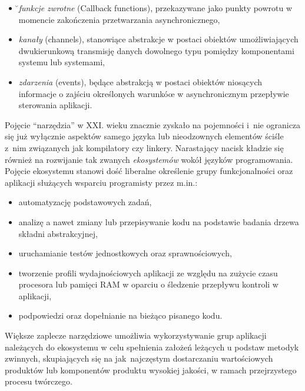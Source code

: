 {\begin{itemize}
  \begin{itemize}
    \item ̆\emph{funkcje zwrotne} (Callback functions), przekazywane jako punkty powrotu w momencie zakończenia przetwarzania asynchronicznego,
    \item \emph{kanały} (channels), stanowiące abstrakcje w postaci obiektów umożliwiających dwukierunkową transmisję danych dowolnego typu pomiędzy komponentami systemu lub systemami,
    \item \emph{zdarzenia} (events), będące abstrakcją w postaci obiektów niosących informacje o zajściu określonych warunkóœ w asynchronicznym przepływie sterowania aplikacji.
  \end{itemize}
\end{itemize}
}

\par{
  Pojęcie ``narzędzia'' w XXI. wieku znacznie zyskało na pojemności i~nie ogranicza się już wyłącznie aspektów samego języka lub nieodzownych elementów ściśle z~nim związanych jak kompilatory czy linkery.
  Narastający nacisk kładzie się również na rozwijanie tak zwanych \emph{ekosystemów} wokół języków programowania.
  Pojęcie ekosystemu stanowi dość liberalne określenie grupy funkcjonalności oraz aplikacji służących wsparciu programisty przez m.in.:
  \begin{itemize}
    \item automatyzację podstawowych zadań,
    \item analizę a nawet zmiany lub przepisywanie kodu na podstawie badania drzewa składni abstrakcyjnej,
    \item uruchamianie testów jednostkowych oraz sprawnościowych,
    \item tworzenie profili wydajnościowych aplikacji ze względu na zużycie czasu procesora lub pamięci RAM w oparciu o śledzenie przepływu kontroli w aplikacji,
    \item podpowiedzi oraz dopełnianie na bieżąco pisanego kodu.
  \end{itemize}
}

\par{
  Większe zaplecze narzędziowe umożliwia wykorzystywanie grup aplikacji należących do ekosystemu w celu spełnienia założeń leżących u podstaw metodyk zwinnych, skupiających się na jak najczęstym dostarczaniu wartościowych produktów lub komponentów produktu wysokiej jakości, w ramach przejrzystego procesu twórczego.
}




